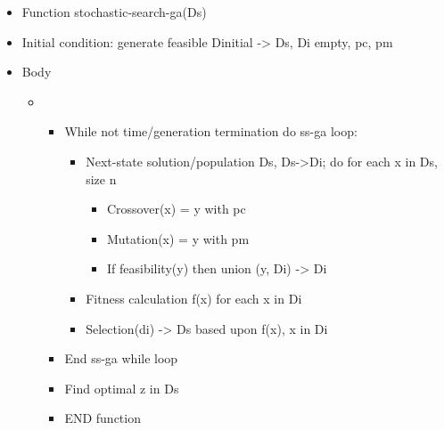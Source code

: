 \documentclass[12pt]{article}
\renewcommand{\_}{\kern-1.5pt\textunderscore\kern-1.5pt}
\begin{document}
\begin{itemize}
	\item Function stochastic-search-ga(Ds)\par

	\item Initial condition: generate feasible Dinitial -> Ds, Di empty, pc, pm\par

	\item Body\par

\begin{itemize}
	\item \begin{itemize}
	\item While not time/generation termination do ss-ga loop:\par

\begin{itemize}
	\item Next-state solution/population Ds, Ds->Di; do for each x in Ds, size n\par

\begin{itemize}
	\item Crossover(x) = y with pc\par

	\item Mutation(x) = y with pm\par

	\item If feasibility(y) then union (y, Di) -> Di\par


\end{itemize}
	\item Fitness calculation f(x) for each x in Di\par

	\item Selection(di) -> Ds based upon f(x), x in Di\par


\end{itemize}
	\item End ss-ga while loop\par

	\item Find optimal z in Ds\par

	\item END function
\end{itemize}
\end{itemize}
\end{itemize}\par
\end{document}
